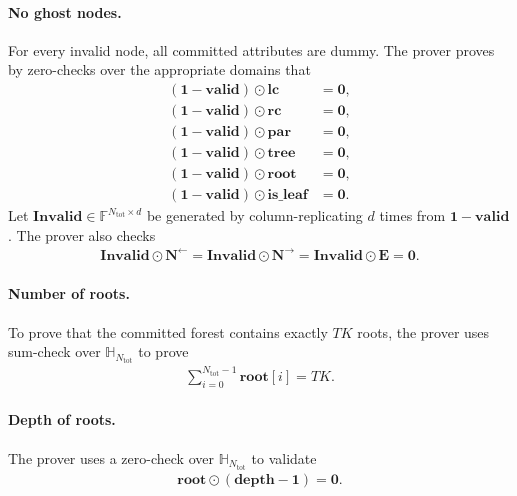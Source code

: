 \paragraph{No ghost nodes.}
For every invalid node, all committed attributes are dummy.  The prover proves
by zero-checks over the appropriate domains that
\begin{align}
    (\mathbf{1}-\mathbf{valid})\odot\mathbf{lc} &=\mathbf{0},\\
    (\mathbf{1}-\mathbf{valid})\odot\mathbf{rc} &=\mathbf{0},\\
    (\mathbf{1}-\mathbf{valid})\odot\mathbf{par}&=\mathbf{0},\\
    (\mathbf{1}-\mathbf{valid})\odot\mathbf{tree}&=\mathbf{0},\\
    (\mathbf{1}-\mathbf{valid})\odot\mathbf{root}&=\mathbf{0},\\
    (\mathbf{1}-\mathbf{valid})\odot\mathbf{is\_leaf}&=\mathbf{0}.
\end{align}
Let $\mathbf{Invalid}\in\mathbb{F}^{N_{\mathrm{tot}}\times d}$ be generated by
column-replicating $d$ times from $\mathbf{1}-\mathbf{valid}$.  The prover also
checks
\begin{align}
    \mathbf{Invalid}\odot\mathbf{N}^{\leftarrow}
    =
    \mathbf{Invalid}\odot\mathbf{N}^{\rightarrow}
    =
    \mathbf{Invalid}\odot\mathbf{E}
    =
    \mathbf{0}.
\end{align}

\paragraph{Number of roots.}
To prove that the committed forest contains exactly $TK$ roots, the prover uses
sum-check over $\mathbb{H}_{N_{\mathrm{tot}}}$ to prove
\begin{align}
    \sum_{i=0}^{N_{\mathrm{tot}}-1}\mathbf{root}[i]=TK.
\end{align}

\paragraph{Depth of roots.}
The prover uses a zero-check over $\mathbb{H}_{N_{\mathrm{tot}}}$ to validate
\begin{align}
    \mathbf{root}\odot(\mathbf{depth}-\mathbf{1})=\mathbf{0}.
\end{align}

